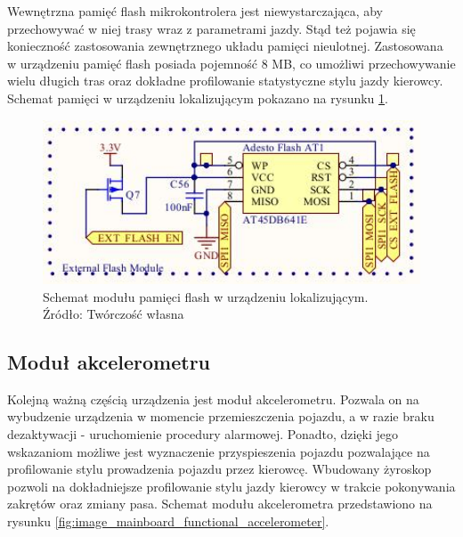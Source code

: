 Wewnętrzna pamięć flash mikrokontrolera jest niewystarczająca, aby przechowywać w niej trasy wraz z parametrami jazdy. Stąd też pojawia się konieczność zastosowania zewnętrznego układu pamięci nieulotnej. Zastosowana w urządzeniu pamięć flash posiada pojemność 8 MB, co umożliwi przechowywanie wielu długich tras oraz dokładne profilowanie statystyczne stylu jazdy kierowcy. Schemat pamięci w urządzeniu lokalizującym pokazano na rysunku \ref{fig:image_mainboard_functional_flash}.

\begin{figure}[H]
	\centering
	\includegraphics[width=15cm]{img/schematics/mainboard_functional_flash_memory.jpg}
	\caption{Schemat modułu pamięci flash w urządzeniu lokalizującym. \\ Źródło: Twórczość własna}
	\label{fig:image_mainboard_functional_flash}
\end{figure}

\subsection{Moduł akcelerometru}

Kolejną ważną częścią urządzenia jest moduł akcelerometru. Pozwala on na wybudzenie urządzenia w momencie przemieszczenia pojazdu, a w razie braku dezaktywacji - uruchomienie procedury alarmowej. Ponadto, dzięki jego wskazaniom możliwe jest wyznaczenie przyspieszenia pojazdu pozwalające na profilowanie stylu prowadzenia pojazdu przez kierowcę. Wbudowany żyroskop pozwoli na dokładniejsze profilowanie stylu jazdy kierowcy w trakcie pokonywania zakrętów oraz zmiany pasa.
Schemat modułu akcelerometra przedstawiono na rysunku \ref{fig:image_mainboard_functional_accelerometer}.

